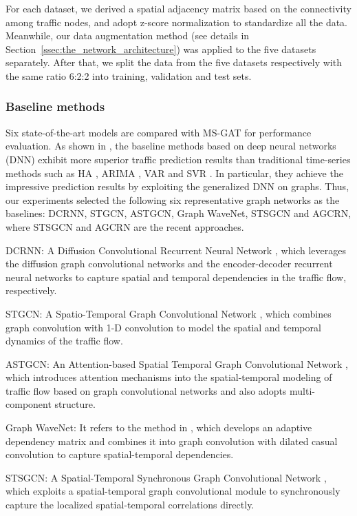 For each dataset, we derived a spatial adjacency matrix based on the connectivity among traffic nodes, and adopt z-score normalization to standardize all the data. Meanwhile, our data augmentation method (see details in Section~\ref{ssec:the_network_architecture}) was applied to the five datasets separately. After that, we split the data from the five datasets respectively with the same ratio 6:2:2 into training, validation and test sets.

\subsubsection{Baseline methods}
Six state-of-the-art models are compared with MS-GAT for performance evaluation. As shown in \cite{song2020spatial,mengzhang2020spatial}, the baseline methods based on deep neural networks (DNN) exhibit more superior traffic prediction results than traditional time-series methods such as HA \cite{liu2004summary}, ARIMA \cite{williams2003modeling}, VAR \cite{zivot2006vector} and SVR \cite{1364002}. In particular, they achieve the impressive prediction results by exploiting the generalized DNN on graphs. Thus, our experiments selected the following six representative graph networks as the baselines: DCRNN, STGCN, ASTGCN, Graph WaveNet, STSGCN and AGCRN, where STSGCN and AGCRN are the recent approaches.  

DCRNN: A Diffusion Convolutional Recurrent Neural Network \cite{li2017diffusion}, which leverages the diffusion graph convolutional networks and the encoder-decoder recurrent neural networks to capture spatial and temporal dependencies in the traffic flow, respectively.

STGCN: A Spatio-Temporal Graph Convolutional Network \cite{yu2017spatio}, which combines graph convolution with 1-D convolution to model the spatial and temporal dynamics of the traffic flow.

ASTGCN: An Attention-based Spatial Temporal Graph Convolutional Network \cite{guo2019attention}, which introduces attention mechanisms into the spatial-temporal modeling of traffic flow based on graph convolutional networks and also adopts multi-component structure.

Graph WaveNet: It refers to the method in \cite{wu2019graph}, which develops an adaptive dependency matrix and combines it into graph convolution with dilated casual convolution to capture spatial-temporal dependencies.

STSGCN: A Spatial-Temporal Synchronous Graph Convolutional Network \cite{song2020spatial}, which exploits a spatial-temporal graph convolutional module to synchronously capture the localized spatial-temporal correlations directly.

